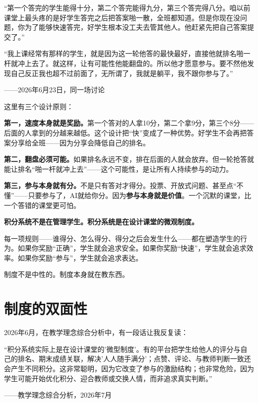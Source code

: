 \begin{shiyu-inline}
``第一个答完的学生能得十分，第二个答完能得九分，第三个答完得八分。咱以前课堂上最头疼的是好学生答完之后把答案啪一散，全班都知道。但是你现在没问题，你为了能够快速答完，好学生根本没工夫去管其他人。他赶紧先把自己答案提交了。''

``我上课经常有那样的学生，就是因为这一轮他答的最快最好，直接他就排名啪一杆就冲上去了。就这样，让有可能性他能翻盘的。所以他才愿意参与。要不然他发现自己反正我也超不过前面了，无所谓了，我就是躺平，我不跟你参与了。''

\hfill ——2026年6月23日，同一场讨论
\end{shiyu-inline}

这里有三个设计原则：

\textbf{第一，速度本身就是奖励。}第一个答对的人拿10分，第二个拿9分，第三个8分——后面的人拿到的分越来越低。这个设计把``快''变成了一种优势。好学生不会再把答案分享给全班——因为分享会降低自己的排名。

\textbf{第二，翻盘必须可能。}如果排名永远不变，排在后面的人就会放弃。但一轮抢答就能让排名``啪一杆就冲上去''——这个可能性，是让所有人持续参与的动力。

\textbf{第三，参与本身就有分。}不是只有答对才得分。投票、开放式问题、甚至点``不懂''——只要参与了，AI就给你分。因为\textbf{参与本身就是价值}。一个沉默的课堂，比一个答错的课堂更可怕。

\begin{insight}
\label{insight:chap5}

\textbf{积分系统不是在管理学生。积分系统是在设计课堂的微观制度。}

每一项规则——谁得分、怎么得分、得分之后会发生什么——都在塑造学生的行为。如果你奖励``正确''，学生就会追求安全。如果你奖励``快速''，学生就会追求效率。如果你奖励``参与''，学生就会追求表达。

制度不是中性的。制度本身就在教东西。
\end{insight}

\section{制度的双面性}

2026年6月，在教学理念综合分析中，有一段话让我反复读：

\begin{shiyu-inline}
``积分系统实际上是在设计课堂的'微型制度'。有的平台把学生给他人的评分与自己的排名、期末成绩关联，解决'人人随手满分'；点赞、评论、与教师判断一致还会产生不同积分。这非常聪明，因为它改变了参与的激励结构；也非常危险，因为学生可能开始优化积分、迎合教师或交换人情，而非追求真实判断。''

\hfill ——教学理念综合分析，2026年7月
\end{shiyu-inline}

